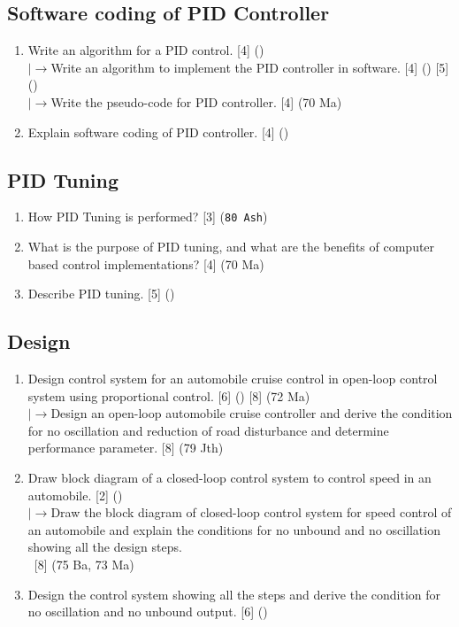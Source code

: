 \documentclass[12pt]{article}
\newcommand{\lb}{\\$\left|\rightarrow\right.$}
\newcommand{\enter}{\\\textcolor{white}{1}}
\begin{document}
  \subsection{Software coding of PID Controller}
    \begin{enumerate}
      \item Write an algorithm for a PID control. \hfill [4] ()
      \lb Write an algorithm to implement the PID controller in software. \hfill [4] () [5] ()
      \lb Write the pseudo-code for PID controller. \hfill [4] (70 Ma)

      \item Explain software coding of PID controller. \hfill [4] ()
    \end{enumerate}

  \subsection{PID Tuning}
    \begin{enumerate}
      \item How PID Tuning is performed? \hfill [3] (\texttt{80 Ash})

      \item What is the purpose of PID tuning, and what are the benefits of computer based control implementations? \hspace{14.7cm} [4] (70 Ma)

      \item Describe PID tuning. \hfill [5] ()
    \end{enumerate}

  \subsection{Design}
    \begin{enumerate}
      \item Design control system for an automobile cruise control in open-loop control system using proportional control. \hfill [6] () [8] (72 Ma)
      \lb Design an open-loop automobile cruise controller and derive the condition for no oscillation and reduction of road disturbance and determine performance parameter. \hfill [8] (79 Jth)

      \item Draw block diagram of a closed-loop control system to control speed in an automobile. \hfill [2] ()
        \lb Draw the block diagram of closed-loop control system for speed control of an automobile and explain the conditions for no unbound and no oscillation showing all the design steps.
        \enter\hfill [8] (75 Ba, 73 Ma)

      \item Design the control system showing all the steps and derive the condition for no oscillation and no unbound output. \hfill [6] ()
    \end{enumerate}
\end{document}
